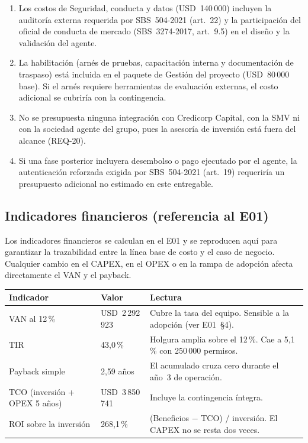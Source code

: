 \documentclass[11pt]{article}
\newcommand{\usd}[1]{USD~#1}
\begin{document}
\begin{enumerate}
\item Los costos de Seguridad, conducta y datos (\usd{140\,000}) incluyen la auditoría externa requerida por SBS~504-2021 (art.~22) y la participación del oficial de conducta de mercado (SBS~3274-2017, art.~9.5) en el diseño y la validación del agente.
\item La habilitación (arnés de pruebas, capacitación interna y documentación de traspaso) está incluida en el paquete de Gestión del proyecto (\usd{80\,000} base). Si el arnés requiere herramientas de evaluación externas, el costo adicional se cubriría con la contingencia.
\item No se presupuesta ninguna integración con Credicorp Capital, con la SMV ni con la sociedad agente del grupo, pues la asesoría de inversión está fuera del alcance (REQ-20).
\item Si una fase posterior incluyera desembolso o pago ejecutado por el agente, la autenticación reforzada exigida por SBS~504-2021 (art.~19) requeriría un presupuesto adicional no estimado en este entregable.
\end{enumerate}

\subsection{Indicadores financieros (referencia al E01)}

Los indicadores financieros se calculan en el E01 y se reproducen aquí para garantizar la trazabilidad entre la línea base de costo y el caso de negocio. Cualquier cambio en el CAPEX, en el OPEX o en la rampa de adopción afecta directamente el VAN y el payback.

\begin{tabularx}{\textwidth}{@{}l l X@{}}
\toprule
\textbf{Indicador} & \textbf{Valor} & \textbf{Lectura} \\
\midrule
VAN al 12\,\%           & \usd{2\,292\,923}  & Cubre la tasa del equipo. Sensible a la adopción (ver E01~§4). \\
TIR                     & 43{,}0\,\%        & Holgura amplia sobre el 12\,\%. Cae a 5,1\,\% con 250\,000 permisos. \\
Payback simple          & 2{,}59 años       & El acumulado cruza cero durante el año~3 de operación. \\
TCO (inversión + OPEX 5 años) & \usd{3\,850\,741} & Incluye la contingencia íntegra. \\
ROI sobre la inversión  & 268{,}1\,\%      & (Beneficios $-$ TCO) / inversión. El CAPEX no se resta dos veces. \\
\bottomrule
\end{tabularx}
\end{document}
